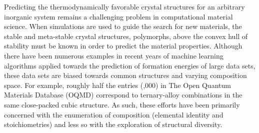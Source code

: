 %
Predicting the thermodynamically favorable crystal structures for an arbitrary inorganic system remains a challenging problem in computational material science.\cite{Woodley2008}
%
%
When simulations are used to guide the search for new materials, the stable and meta-stable crystal structures,  polymorphs,  above the convex hull of stability must be known in order to predict the material properties.\cite{}
Although there have been numerous examples in recent years of machine learning algorithms applied towards the prediction of formation energies of large  data sets,
these data sets are biased towards common structures and varying composition space.\cite{}
For example, roughly half the entries (,000) in The Open Quantum Materials Database (OQMD) correspond to ternary-alloy combinations in the same close-packed cubic structure.
As such, these efforts have been primarily concerned with the enumeration of composition (elemental identity and stoichiometries) and less so with the exploration of structural diversity.
%
%


